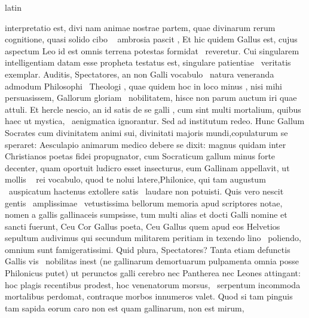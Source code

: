 \documentclass[12pt]{book}
\renewenvironment{latin}
    	{\begin{hyphenrules}{latin}}
    	{\end{hyphenrules}}
\begin{document}
\begin{pages}
\begin{latin}
\begin{Leftside}
                  interpretatio est, divi nam animae nostrae partem, quae divinarum rerum cognitione, quasi solido cibo  \ampersand\  ambrosia pascit , 
                  Et hic quidem Gallus est, cujus aspectum Leo id est omnis terrena potestas formidat  \ampersand\ reveretur. Cui singularem intelligentiam datam esse propheta testatus est, singulare patientiae  \ampersand\ veritatis exemplar. 
                  Auditis, Spectatores, an non Galli vocabulo  \ampersand\ natura veneranda admodum  Philosophi   \ampersand\ Theologi , 
                  quae quidem hoc in loco minus , nisi mihi persuasissem, Gallorum gloriam  \ampersand\ nobilitatem, hisce non parum auctum iri quae attuli.
                  Et hercle nescio, an id satis de se galli , cum sint multi mortalium, quibus haec ut mystica,  \ampersand\ aenigmatica ignorantur. 
                  Sed ad institutum redeo. Hunc Gallum Socrates cum divinitatem animi sui, divinitati majoris mundi,copulaturum se speraret: Aesculapio  animarum medico debere se dixit:
                   magnus quidam inter Christianos poetas fidei propugnator, cum Socraticum gallum minus forte decenter,
                  quam oportuit ludicro esset insecturus, eum Gallinam appellavit, ut mollis  \ampersand\  rei vocabulo, 
                  quod te nolui latere,Philonice, qui tam augustum  \ampersand\ auspicatum hactenus extollere satis  \ampersand\ laudare non potuisti. Quis vero nescit gentis  \ampersand\ amplissimae 
                   \ampersand\ vetustissima bellorum memoria apud scriptores notae, nomen a gallis gallinaceis sumpsisse, tum multi alias et docti Galli nomine et sancti fuerunt, Ceu Cor Gallus poeta, Ceu Gallus  
                  quem apud eos Helvetios sepultum audivimus qui secundum militarem peritiam in texendo lino  \ampersand\ poliendo, omnium sunt famigeratissimi. Quid plura, Spectatores? 
                  Tanta etiam defunctis Gallis vis  \ampersand\ nobilitas inest (ne gallinarum demortuarum pulpamenta omnia posse Philonicus putet) ut perunctos galli cerebro nec Pantherea nec Leones attingant: 
                  hoc plagis recentibus prodest, hoc venenatorum morsus,  \ampersand\ serpentum incommoda mortalibus perdomat, contraque morbos innumeros valet. Quod si tam pinguis tam sapida eorum caro non est quam gallinarum, non est mirum, 

\end{Leftside}
\end{latin}
\end{pages}
\end{document}

